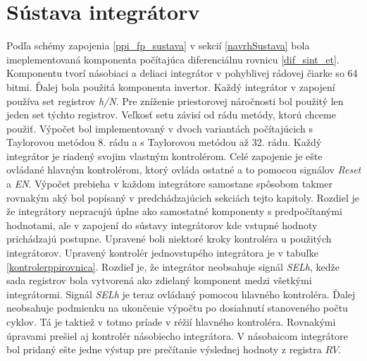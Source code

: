 \section{Sústava integrátorv} \label{impl_rovnice}
Podľa schémy zapojenia  \ref{ppi_fp_sustava} v sekcií \ref{navrhSustava} bola imeplementovaná komponenta počítajúca diferenciálnu rovnicu \ref{dif_sint_et}. Komponentu tvorí násobiaci a deliaci integrátor v pohyblivej rádovej čiarke so 64 bitmi. Ďalej bola použitá komponenta invertor. Každý integrátor v zapojení používa set registrov \textit{h/N}. Pre zníženie priestorovej náročnosti bol použitý len jeden set týchto registrov. Veľkosť setu závisí od rádu metódy, ktorú chceme použiť. Výpočet bol implementovaný v dvoch variantách počítajúcich s Taylorovou metódou 8. rádu a s Taylorovou metódou až 32. rádu.
Každý integrátor je riadený svojim vlastným kontrolérom. Celé zapojenie je ešte ovládané hlavným kontrolérom, ktorý ovláda ostatné a to pomocou signálov \textit{Reset} a \textit{EN}. Výpočet prebieha v každom integrátore samostane spôsobom takmer rovnakým aký bol popísaný v predchádzajúcich sekciách tejto kapitoly. Rozdiel je že integrátory nepracujú úplne ako samostatné komponenty s predpočítanými hodnotami, ale v zapojení do sústavy integrátorov kde vstupné hodnoty prichádzajú postupne. Upravené boli niektoré kroky kontroléra u použitých integrátorov. Upravený kontrolér jednovstupého integrátora je v tabuľke \ref{kontrolerppirovnica}. Rozdieľ je, že  integrátor neobsahuje signál \textit{SELh}, kedže sada registrov bola vytvorená ako zdielaný komponent medzi všetkými integrátormi. Signál \textit{SELh} je teraz ovládaný pomocou hlavného kontroléra. Ďalej neobsahuje podmienku na ukončenie výpočtu po dosiahnutí stanoveného počtu cyklov. Tá je  taktiež v totmo príade v réžií hlavného kontroléra. Rovnakými úpravami prešiel aj kontrolér násobiecho integrátora. V násobaicom integrátore bol pridaný ešte jedne výstup pre prečítanie výslednej hodnoty z registra $ RV $. 


